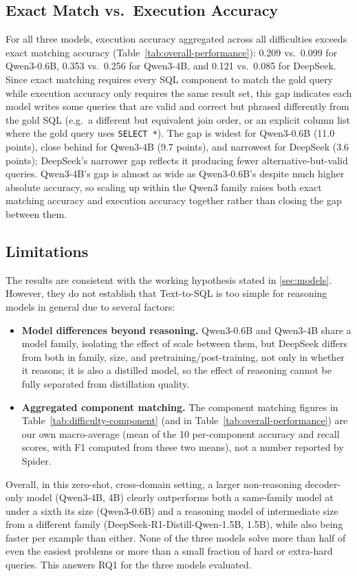 \subsection{Exact Match vs.\ Execution Accuracy}
\label{sec:rq1-exact-vs-execution}

For all three models, execution accuracy aggregated across all difficulties exceeds exact matching accuracy (Table~\ref{tab:overall-performance}): 0.209 vs.\ 0.099 for Qwen3-0.6B, 0.353 vs.\ 0.256 for Qwen3-4B, and 0.121 vs.\ 0.085 for DeepSeek. Since exact matching requires every SQL component to match the gold query while execution accuracy only requires the same result set, this gap indicates each model writes some queries that are valid and correct but phrased differently from the gold SQL (e.g.\ a different but equivalent join order, or an explicit column list where the gold query uses \texttt{SELECT *}). The gap is widest for Qwen3-0.6B (11.0 points), close behind for Qwen3-4B (9.7 points), and narrowest for DeepSeek (3.6 points); DeepSeek's narrower gap reflects it producing fewer alternative-but-valid queries. Qwen3-4B's gap is almost as wide as Qwen3-0.6B's despite much higher absolute accuracy, so scaling up within the Qwen3 family raises both exact matching accuracy and execution accuracy together rather than closing the gap between them.

\subsection{Limitations}
\label{sec:rq1-limitations}

The results are consistent with the working hypothesis stated in \ref{sec:models}. However, they do not establish that Text-to-SQL is too simple for reasoning models in general due to several factors:

\begin{itemize}
\item \textbf{Model differences beyond reasoning.} Qwen3-0.6B and Qwen3-4B share a model family, isolating the effect of scale between them, but DeepSeek differs from both in family, size, and pretraining/post-training, not only in whether it reasons; it is also a distilled model, so the effect of reasoning cannot be fully separated from distillation quality.
\item \textbf{Aggregated component matching.} The component matching figures in Table~\ref{tab:difficulty-component} (and in Table~\ref{tab:overall-performance}) are our own macro-average (mean of the 10 per-component accuracy and recall scores, with F1 computed from these two means), not a number reported by Spider.
\end{itemize}

Overall, in this zero-shot, cross-domain setting, a larger non-reasoning decoder-only model (Qwen3-4B, 4B) clearly outperforms both a same-family model at under a sixth its size (Qwen3-0.6B) and a reasoning model of intermediate size from a different family (DeepSeek-R1-Distill-Qwen-1.5B, 1.5B), while also being faster per example than either. None of the three models solve more than half of even the easiest problems or more than a small fraction of hard or extra-hard queries. This answers RQ1 for the three models evaluated.